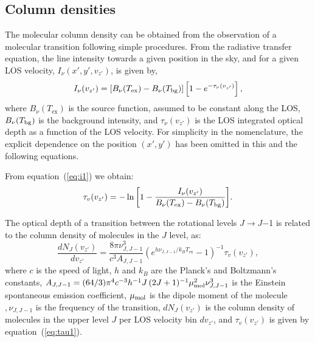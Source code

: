 \documentclass[12pt]{mythesis}
\begin{document}


\subsection{Column densities}

The molecular column density can be obtained from the observation of a molecular transition following simple procedures. From the radiative transfer equation, the line intensity towards a given position in the sky, and for a given LOS velocity, $I_\nu(x',y',v_{z'})$, is given by, 
\begin{equation}
	I_\nu (v_{z'}) = \left[B_\nu(T_\mathrm{ex}) - B_\nu(T_{\rm bg})\right] \left[1-e^{-\tau_\nu(v_{z'})}\right],
\label{eq:i1}
\end{equation}
where $B_\nu(T_\mathrm{ex})$ is the source function, assumed to be constant along the LOS, $B_\nu(T_{\rm bg})$ is the background intensity, and $\tau_\nu(v_{z'})$ is the LOS integrated optical depth as a function of the LOS velocity. For simplicity in the nomenclature, the explicit dependence on the position $(x',y')$ has been omitted in this and the following equations. 

From equation~(\ref{eq:i1}) we obtain:
\begin{equation}
\tau_v (v_{z'}) = - \ln{\left[1- \frac{I_\nu (v_{z'})}{B_\nu(T_\mathrm{ex}) - B_\nu(T_{\rm bg})}\right]}.
\label{eq:tau1}
\end{equation}

The optical depth of a transition between the rotational levels $J$$\rightarrow$$J$$-$1 is related to the column density of molecules in the $J$ level, as:
\begin{equation}
 \frac{d N_J(v_{z'})}{dv_{z'}} = \frac{8\pi\nu^3_{J,J-1}}{c^3 A_{J,J-1}} \left(e^{h\nu_{J,J-1}/k_B T_\mathrm{ex}}-1\right)^{-1} \tau_v (v_{z'}), 
\label{eq:dNJ}
\end{equation}
where $c$ is the speed of light, $h$ and $k_B$ are the Planck's and Boltzmann's constants, $A_{J,J-1} = (64/3) \pi^4  c^{-3} h^{-1} J\, (2J+1)^{-1} \mu_{\rm mol}^2 \nu^3_{J,J-1}$
is the Einstein spontaneous emission coefficient, $\mu_{\rm mol}$ is the dipole moment of the molecule$, \nu_{J,J-1}$ is the frequency of the transition, $d N_J(v_{z'})$ is the column density of molecules in the upper level $J$ per LOS velocity bin $d v_{z'}$, and $\tau_v (v_{z'})$ is given by equation~(\ref{eq:tau1}).
\end{document}
